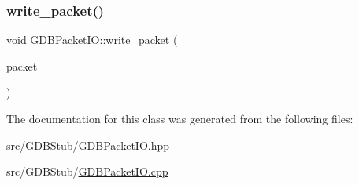 \mbox{\label{classxd_1_1dbg_1_1gdbstub_1_1_g_d_b_packet_i_o_a40341bea13824906882825ddf2474c93}} 
\subsubsection{\texorpdfstring{write\+\_\+packet()}{write\_packet()}}
{\footnotesize\ttfamily void G\+D\+B\+Packet\+I\+O\+::write\+\_\+packet (\begin{DoxyParamCaption}\item[{const \mbox{\hyperlink{classxd_1_1dbg_1_1gdbstub_1_1pkt_1_1_g_d_b_response_packet}{pkt\+::\+G\+D\+B\+Response\+Packet}} \&}]{packet }\end{DoxyParamCaption})}



The documentation for this class was generated from the following files\+:\begin{DoxyCompactItemize}
\item 
src/\+G\+D\+B\+Stub/\mbox{\hyperlink{_g_d_b_packet_i_o_8hpp}{G\+D\+B\+Packet\+I\+O.\+hpp}}\item 
src/\+G\+D\+B\+Stub/\mbox{\hyperlink{_g_d_b_packet_i_o_8cpp}{G\+D\+B\+Packet\+I\+O.\+cpp}}\end{DoxyCompactItemize}
